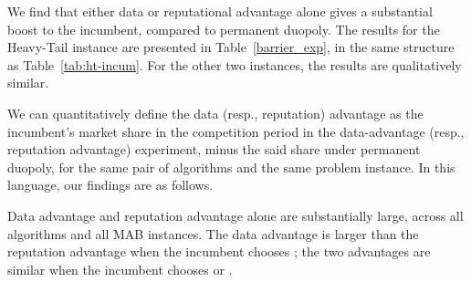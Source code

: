 \documentclass[../competing_bandits.tex]{subfiles}
\begin{document}
We find that either data or reputational advantage alone gives a substantial boost to the incumbent, compared to permanent duopoly. The results for the Heavy-Tail instance are presented in Table~\ref{barrier_exp}, in the same structure as Table~\ref{tab:ht-incum}. For the other two instances, the results are qualitatively similar.

We can quantitatively define the data (resp., reputation) advantage as the incumbent's market share in the competition period in the data-advantage (resp., reputation advantage) experiment, minus the said share under permanent duopoly, for the same pair of algorithms and the same problem instance. In this language, our findings are as follows.


\begin{finding}\label{barrier-find}
Data advantage and reputation advantage alone are substantially large, across all algorithms and all MAB instances. The data advantage is larger than the reputation advantage when the incumbent chooses \TS; the two advantages are similar when the incumbent chooses \DEG or \DG.
\end{finding}


\end{document}
